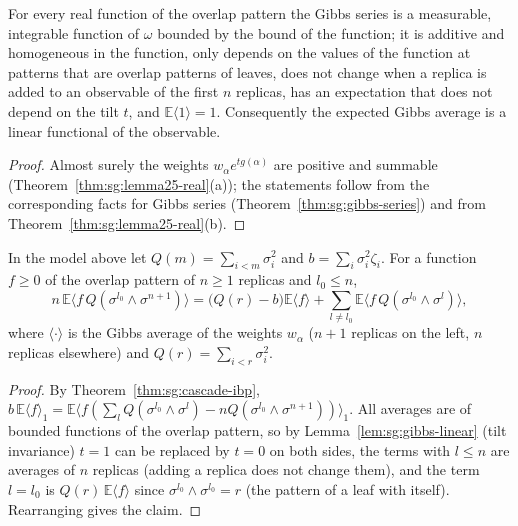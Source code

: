 \begin{lemma}\label{lem:sg:gibbs-linear}
  \leanok
For every real function of the overlap pattern the Gibbs series is a measurable, integrable function of $\omega$ bounded by the bound of the function; it is additive and homogeneous in the function,
only depends on the values of the function at patterns that are overlap patterns of leaves, does not change when a replica is added to an observable of the first $n$ replicas, has an expectation that does not depend on the tilt $t$, and
$\mathbb E\langle1\rangle=1$. Consequently the expected Gibbs average is a linear functional of the observable.
\end{lemma}
\begin{proof}
  \leanok
Almost surely the weights $w_\alpha e^{tg(\alpha)}$ are positive and summable (Theorem~\ref{thm:sg:lemma25-real}(a)); the statements follow from the corresponding facts for Gibbs series (Theorem~\ref{thm:sg:gibbs-series}) and from Theorem~\ref{thm:sg:lemma25-real}(b).
\end{proof}

\begin{theorem}\label{thm:sg:gg-Q}
  \leanok
In the model above let $Q(m)=\sum_{i<m}\sigma_i^2$ and $b=\sum_i\sigma_i^2\zeta_i$. For a function $f\ge0$ of the overlap pattern of $n\ge1$ replicas and $l_0\le n$,
\[
 n\,\mathbb E\langle f\,Q(\sigma^{l_0}\wedge\sigma^{n+1})\rangle=\Big(Q(r)-b\Big)\mathbb E\langle f\rangle+\sum_{l\ne l_0}\mathbb E\langle f\,Q(\sigma^{l_0}\wedge\sigma^{l})\rangle ,
\]
where $\langle\cdot\rangle$ is the Gibbs average of the weights $w_\alpha$ ($n+1$ replicas on the left, $n$ replicas elsewhere) and $Q(r)=\sum_{i<r}\sigma_i^2$.
\end{theorem}
\begin{proof}
  \leanok
By Theorem~\ref{thm:sg:cascade-ibp}, $b\,\mathbb E\langle f\rangle_1=\mathbb E\langle f(\sum_lQ(\sigma^{l_0}\wedge\sigma^l)-nQ(\sigma^{l_0}\wedge\sigma^{n+1}))\rangle_1$.
All averages are of bounded functions of the overlap pattern, so by Lemma~\ref{lem:sg:gibbs-linear} (tilt invariance) $t=1$ can be replaced by $t=0$ on both sides, the terms with $l\le n$ are averages of $n$ replicas
(adding a replica does not change them), and the term $l=l_0$ is $Q(r)\,\mathbb E\langle f\rangle$ since $\sigma^{l_0}\wedge\sigma^{l_0}=r$ (the pattern of a leaf with itself). Rearranging gives the claim.
\end{proof}

